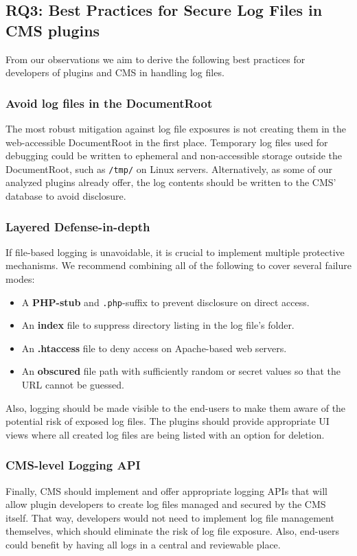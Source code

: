 \documentclass[sigconf]{acmart}
\begin{document}
\subsection{RQ3: Best Practices for Secure Log Files in CMS plugins}
From our observations we aim to derive the following best practices for developers of plugins and CMS in handling log files.

\subsubsection{Avoid log files in the DocumentRoot}
The most robust mitigation against log file exposures is not creating them in the web-accessible DocumentRoot in the first place. Temporary log files used for debugging could be written to ephemeral and non-accessible storage outside the DocumentRoot, such as \texttt{/tmp/} on Linux servers. 
Alternatively, as some of our analyzed plugins already offer, the log contents should be written to the CMS' database to avoid disclosure.

\subsubsection{Layered Defense-in-depth}
If file-based logging is unavoidable, it is crucial to implement multiple protective mechanisms. We recommend combining all of the following to cover several failure modes:
\begin{itemize}
    \item A \textbf{PHP-stub} and \texttt{.php}-suffix to prevent disclosure on direct access. 
    \item An \textbf{index} file to suppress directory listing in the log file's folder.
    \item An \textbf{.htaccess} file to deny access on Apache-based web servers. 
    \item An \textbf{obscured} file path with sufficiently random or secret values so that the URL cannot be guessed.
\end{itemize}

Also, logging should be made visible to the end-users to make them aware of the potential risk of exposed log files. The plugins should provide appropriate UI views where all created log files are being listed with an option for deletion.

\subsubsection{CMS-level Logging API}
Finally, CMS should implement and offer appropriate logging APIs that will allow plugin developers to create log files managed and secured by the CMS itself. 
That way, developers would not need to implement log file management themselves, which should eliminate the risk of log file exposure. Also, end-users could benefit by having all logs in a central and reviewable place. 
\end{document}
